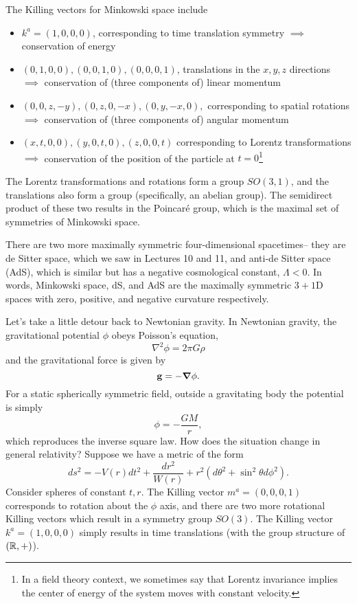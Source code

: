 The Killing vectors for Minkowski space include
\begin{itemize}
\item $k^a=(1,0,0,0)$,
corresponding to time translation symmetry $\implies$ conservation of energy
\item $(0,1,0,0),(0,0,1,0),(0,0,0,1)$, translations in the $x,y,z$ directions $\implies$ conservation of (three components of) linear momentum
\item $(0,0,z,-y),(0,z,0,-x),(0,y,-x,0),$ corresponding to spatial rotations $\implies$ conservation of (three components of) angular momentum
\item $(x,t,0,0),(y,0,t,0),(z,0,0,t)$ corresponding to Lorentz transformations $\implies$ conservation of the position of the particle at $t=0$\footnote{In a field theory context, we sometimes say that Lorentz invariance implies the center of energy of the system moves with constant velocity.}
\end{itemize}
The Lorentz transformations and rotations form a group $SO(3,1)$, and the translations also form a group (specifically, an abelian group). The semidirect product of these two results in the Poincar\'e group, which is the maximal set of symmetries of Minkowski space.

There are two more maximally symmetric four-dimensional spacetimes-- they are de Sitter space, which we saw in Lectures 10 and 11, and anti-de Sitter space (AdS), which is similar but has a negative cosmological constant, $\Lambda < 0$. In words, Minkowski space, dS, and AdS are the maximally symmetric $3+1$D spaces with zero, positive, and negative curvature respectively.

Let's take a little detour back to Newtonian gravity. In Newtonian gravity, the gravitational potential $\phi$ obeys Poisson's equation,
$$\nabla^2 \phi=2\pi G \rho$$
and the gravitational force is given by
$$\boldsymbol{\mathbf{g}} = -\mbox{\boldmath$ \nabla $} \phi.$$
For a static spherically symmetric field, outside a gravitating body the potential is simply
$$\phi=-\frac{GM}{r},$$
which reproduces the inverse square law. How does the situation change in general relativity? Suppose we have a metric of the form
$$ds^2=-V(r)dt^2 +\frac{dr^2}{W(r)}+r^2(d\theta^2+\sin^2\theta d\phi^2).$$
Consider spheres of constant $t,r$. The Killing vector $m^a=(0,0,0,1)$ corresponds to rotation about the $\phi$ axis, and there are two more rotational Killing vectors which result in a symmetry group $SO(3).$ The Killing vector $k^a=(1,0,0,0)$ simply results in time translations (with the group structure of $(\mathbb{R},+)$).

